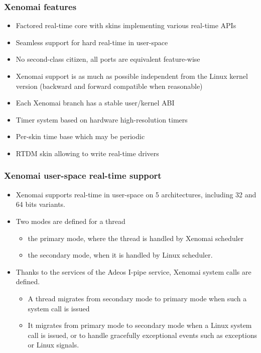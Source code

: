 \begin{frame}
  \frametitle{Xenomai features}
  \begin{itemize}
  \item Factored real-time core with skins implementing various
    real-time APIs
  \item Seamless support for hard real-time in user-space
  \item No second-class citizen, all ports are equivalent feature-wise
  \item Xenomai support is as much as possible independent from the
    Linux kernel version (backward and forward compatible when
    reasonable)
  \item Each Xenomai branch has a stable user/kernel ABI
  \item Timer system based on hardware high-resolution timers
  \item Per-skin time base which may be periodic
  \item RTDM skin allowing to write real-time drivers
  \end{itemize}
\end{frame}

\begin{frame}
  \frametitle{Xenomai user-space real-time support}
  \begin{itemize}
  \item Xenomai supports real-time in user-space on 5 architectures,
    including 32 and 64 bits variants.
  \item Two modes are defined for a thread
    \begin{itemize}
    \item the primary mode, where the thread is handled by Xenomai
      scheduler
    \item the secondary mode, when it is handled by Linux scheduler.
    \end{itemize}
  \item Thanks to the services of the Adeos I-pipe service, Xenomai
    system calls are defined.
    \begin{itemize}
    \item A thread migrates from secondary mode to primary mode when
      such a system call is issued
    \item It migrates from primary mode to secondary mode when a Linux
      system call is issued, or to handle gracefully exceptional
      events such as exceptions or Linux signals.
    \end{itemize}
  \end{itemize}
\end{frame}

